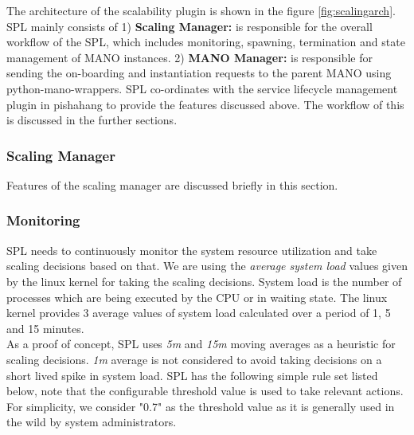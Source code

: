 The architecture of the scalability plugin is shown in the figure \ref{fig:scalingarch}. SPL mainly consists of 1) \textbf{Scaling Manager:} is responsible for the overall workflow of the SPL, which includes monitoring, spawning, termination and state management of MANO instances. 2) \textbf{MANO Manager:} is responsible for sending the on-boarding and instantiation requests to the parent MANO using python-mano-wrappers. SPL co-ordinates with the service lifecycle management plugin in pishahang to provide the features discussed above. The workflow of this is discussed in the further sections. 

\subsubsection{Scaling Manager}

Features of the scaling manager are discussed briefly in this section. 

\subsubsection*{Monitoring}

SPL needs to continuously monitor the system resource utilization and take scaling decisions based on that. We are using the \textit{average system load} values given by the linux kernel for taking the scaling decisions. System load is the number of processes which are being executed by the CPU or in waiting state. The linux kernel provides 3 average values of system load calculated over a period of 1, 5 and 15 minutes. \\

As a proof of concept, SPL uses \textit{5m} and \textit{15m} moving averages as a heuristic for scaling decisions. \textit{1m} average is not considered to avoid taking decisions on a short lived spike in system load. SPL has the following simple rule set listed below, note that the configurable threshold value is used to take relevant actions. For simplicity, we consider "0.7" as the threshold value as it is generally used in the wild by system administrators. 

